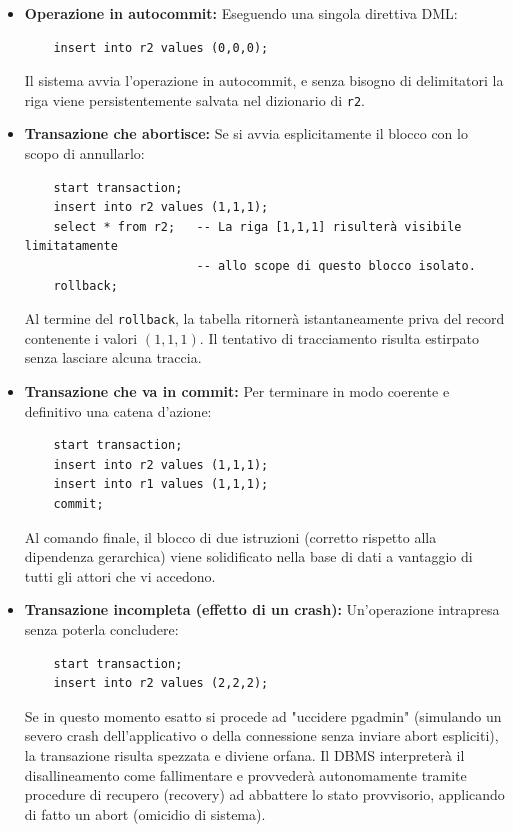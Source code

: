 \begin{itemize}
    \item \textbf{Operazione in autocommit:}
    Eseguendo una singola direttiva DML:
    \begin{verbatim}
    insert into r2 values (0,0,0);
    \end{verbatim}
    Il sistema avvia l'operazione in autocommit, e senza bisogno di delimitatori la riga viene persistentemente salvata nel dizionario di \texttt{r2}.

    \item \textbf{Transazione che abortisce:}
    Se si avvia esplicitamente il blocco con lo scopo di annullarlo:
    \begin{verbatim}
    start transaction;
    insert into r2 values (1,1,1);
    select * from r2;   -- La riga [1,1,1] risulterà visibile limitatamente
                        -- allo scope di questo blocco isolato.
    rollback;
    \end{verbatim}
    Al termine del \texttt{rollback}, la tabella ritornerà istantaneamente priva del record contenente i valori $(1,1,1)$. Il tentativo di tracciamento risulta estirpato senza lasciare alcuna traccia.

    \item \textbf{Transazione che va in commit:}
    Per terminare in modo coerente e definitivo una catena d'azione:
    \begin{verbatim}
    start transaction;
    insert into r2 values (1,1,1);
    insert into r1 values (1,1,1);
    commit;
    \end{verbatim}
    Al comando finale, il blocco di due istruzioni (corretto rispetto alla dipendenza gerarchica) viene solidificato nella base di dati a vantaggio di tutti gli attori che vi accedono.

    \item \textbf{Transazione incompleta (effetto di un crash):}
    Un'operazione intrapresa senza poterla concludere:
    \begin{verbatim}
    start transaction;
    insert into r2 values (2,2,2);
    \end{verbatim}
    Se in questo momento esatto si procede ad "uccidere pgadmin" (simulando un severo crash dell'applicativo o della connessione senza inviare abort espliciti), la transazione risulta spezzata e diviene orfana. Il DBMS interpreterà il disallineamento come fallimentare e provvederà autonomamente tramite procedure di recupero (recovery) ad abbattere lo stato provvisorio, applicando di fatto un abort (omicidio di sistema).
\end{itemize}

